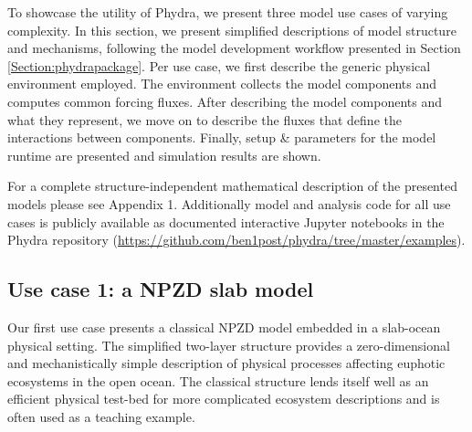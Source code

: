\documentclass[journal abbreviations, manuscript]{copernicus}
\begin{document}

To showcase the utility of Phydra, we present three model use cases of varying complexity. In this section, we present simplified descriptions of model structure and mechanisms, following the model development workflow presented in Section \ref{Section:phydrapackage}.
Per use case, we first describe the generic physical environment employed. The environment collects the model components and computes common forcing fluxes. After describing the model components and what they represent, we move on to describe the fluxes that define the interactions between components. Finally, setup \& parameters for the model runtime are presented and simulation results are shown.

For a complete structure-independent mathematical description of the presented models please see Appendix 1. Additionally model and analysis code for all use cases is publicly available as documented interactive Jupyter notebooks in the Phydra repository (\url{https://github.com/ben1post/phydra/tree/master/examples}). 

\subsection{Use case 1: a NPZD slab model}
Our first use case presents a classical NPZD model embedded in a slab-ocean physical setting. The simplified two-layer structure provides a zero-dimensional and mechanistically simple description of physical processes affecting euphotic ecosystems in the open ocean. The classical structure lends itself well as an efficient physical test-bed for more complicated ecosystem descriptions and is often used as a teaching example.
\end{document}
